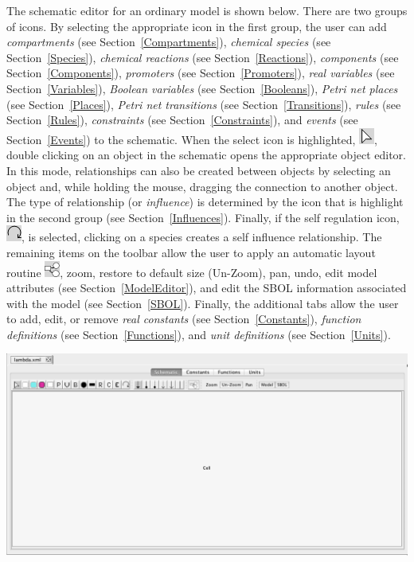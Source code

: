 \documentclass[titlepage,11pt]{article}
\begin{document}
\noindent
The schematic editor for an ordinary model is shown below.  There are two groups of icons.  By selecting the appropriate icon in the first group, the user can add \emph{compartments} (see Section~\ref{Compartments}), \emph{chemical species} (see Section~\ref{Species}), 
\emph{chemical reactions} (see Section~\ref{Reactions}), \emph{components} (see Section~\ref{Components}), \emph{promoters} (see Section~\ref{Promoters}), \emph{real variables} (see Section~\ref{Variables}), \emph{Boolean variables} (see Section~\ref{Booleans}), \emph{Petri net places} (see Section~\ref{Places}), \emph{Petri net transitions} (see Section~\ref{Transitions}), \emph{rules} (see Section~\ref{Rules}), \emph{constraints} (see Section~\ref{Constraints}), and \emph{events} (see Section~\ref{Events}) to the schematic.  When the select icon is highlighted, \includegraphics{../gui/icons/modelview/select_mode_selected}, double clicking on an object in the schematic opens the appropriate object editor.  In this mode, relationships can also be created between objects by selecting an object and, while holding the mouse, dragging the connection to another object.  The type of relationship (or \emph{influence}) is determined by the icon that is highlight in the second group  (see Section~\ref{Influences}).  Finally, if the self regulation icon,
\includegraphics{../gui/icons/modelview/self_influence_selected}, is selected, clicking on a species creates a self influence relationship.  The remaining items on the toolbar allow the user to apply an automatic layout routine \includegraphics{../gui/icons/modelview/choose_layout_selected}, zoom, restore to default size (Un-Zoom), pan, undo, edit model attributes (see Section~\ref{ModelEditor}), and edit the SBOL information associated with the model (see Section~\ref{SBOL}).  Finally, the additional tabs allow the user to add, edit, or remove \emph{real constants} (see Section~\ref{Constants}), \emph{function definitions} (see Section~\ref{Functions}), and \emph{unit definitions} (see Section~\ref{Units}).

\begin{center}
\includegraphics[width=160mm]{screenshots/ModelEditor}
\end{center}
\end{document}
